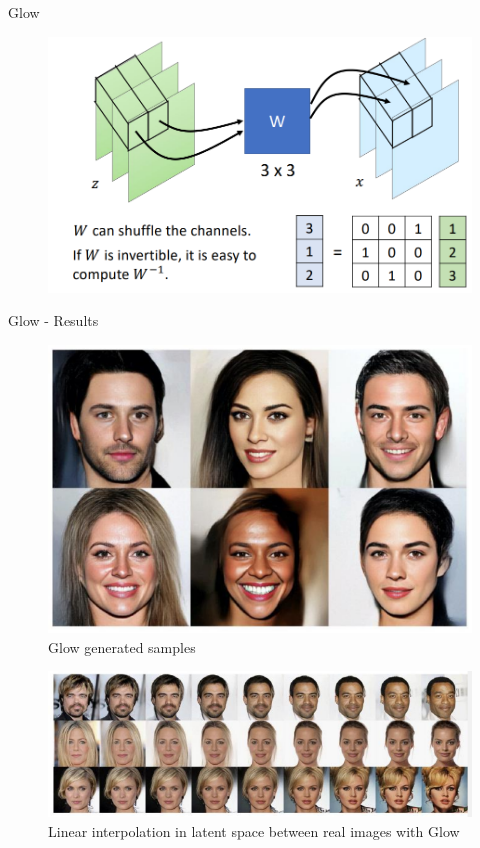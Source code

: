 \begin{frame}[allowframebreaks]{Glow}
\framebreak

\begin{figure}
    \centering
    \includegraphics[height=0.9\textheight, width=\textwidth, keepaspectratio]{images/norm-flow/nfm_glow_1.png}
\end{figure}
\end{frame}

\begin{frame}[allowframebreaks]{Glow - Results}
\begin{figure}
    \centering
    \includegraphics[height=0.8\textheight, width=\textwidth, keepaspectratio]{images/norm-flow/nfm_glow_results_1.png}
    \caption*{Glow generated samples}
\end{figure}

\framebreak

\begin{figure}
    \centering
    \includegraphics[height=0.8\textheight, width=\textwidth, keepaspectratio]{images/norm-flow/nfm_glow_results_2.png}
    \caption*{Linear interpolation in latent space between real images with Glow}
\end{figure}
\end{frame}
